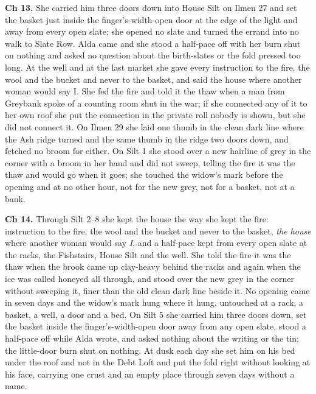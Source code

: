 \documentclass{design/chronicle}
\begin{document}
{\textbf{Ch 13.} She carried him three doors down into House Silt on Ilmen 27 and set the basket just inside the finger’s-width-open door at the edge of the light and away from every open slate; she opened no slate and turned the errand into no walk to Slate Row. Alda came and she stood a half-pace off with her burn shut on nothing and asked no question about the birth-slates or the fold pressed too long. At the well and at the last market she gave every instruction to the fire, the wool and the bucket and never to the basket, and said the house where another woman would say I. She fed the fire and told it the thaw when a man from Greybank spoke of a counting room shut in the war; if she connected any of it to her own roof she put the connection in the private roll nobody is shown, but she did not connect it. On Ilmen 29 she laid one thumb in the clean dark line where the Ash ridge turned and the same thumb in the ridge two doors down, and fetched no broom for either. On Silt 1 she stood over a new hairline of grey in the corner with a broom in her hand and did not sweep, telling the fire it was the thaw and would go when it goes; she touched the widow’s mark before the opening and at no other hour, not for the new grey, not for a basket, not at a bank.

\textbf{Ch 14.} Through Silt 2–8 she kept the house the way she kept the fire: instruction to the fire, the wool and the bucket and never to the basket, \emph{the house} where another woman would say \emph{I}, and a half-pace kept from every open slate at the racks, the Fishstairs, House Silt and the well. She told the fire it was the thaw when the brook came up clay-heavy behind the racks and again when the ice was called honeyed all through, and stood over the new grey in the corner without sweeping it, finer than the old clean dark line beside it. No opening came in seven days and the widow’s mark hung where it hung, untouched at a rack, a basket, a well, a door and a bed. On Silt 5 she carried him three doors down, set the basket inside the finger’s-width-open door away from any open slate, stood a half-pace off while Alda wrote, and asked nothing about the writing or the tin; the little-door burn shut on nothing. At dusk each day she set him on his bed under the roof and not in the Debt Loft and put the fold right without looking at his face, carrying one crust and an empty place through seven days without a name.

}
\end{document}
